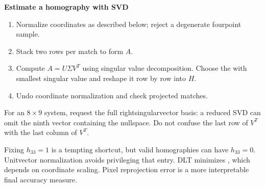 \documentclass[letterpaper,11pt,english,openany,oneside]{jupyterBook}
\begin{document}
\begin{TextbookBox}
\textbf{Estimate a homography with SVD}\par\smallskip
\begin{enumerate}
%
\item {}
\sphinxAtStartPar
Normalize coordinates as described below; reject a degenerate four\sphinxhyphen{}point sample.

\item {}
\sphinxAtStartPar
Stack two rows per match to form \(A\).

\item {}
\sphinxAtStartPar
Compute \(A=U\Sigma V^T\) using singular value decomposition. Choose the  with smallest singular value and reshape it row by row into \(H\).

\item {}
\sphinxAtStartPar
Undo coordinate normalization and check projected matches.

\end{enumerate}

\sphinxAtStartPar
For an \(8\times9\) system, request the full right\sphinxhyphen{}singular\sphinxhyphen{}vector basis: a reduced SVD can omit the ninth vector containing the nullspace. Do not confuse the last row of \(V^T\) with the last column of \(V^T\).

\end{TextbookBox}

\sphinxAtStartPar
Fixing \(h_{33}=1\) is a tempting shortcut, but valid homographies can have \(h_{33}=0\). Unit\sphinxhyphen{}vector normalization avoids privileging that entry. DLT minimizes , which depends on coordinate scaling. Pixel reprojection error is a more interpretable final accuracy measure.
\end{document}
